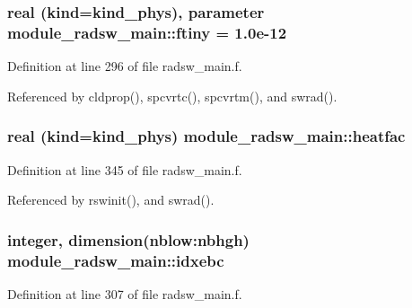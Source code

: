 \subsubsection[{\texorpdfstring{ftiny}{ftiny}}]{\setlength{\rightskip}{0pt plus 5cm}real (kind=kind\+\_\+phys), parameter module\+\_\+radsw\+\_\+main\+::ftiny = 1.\+0e-\/12\hspace{0.3cm}{\ttfamily [private]}}\hypertarget{namespacemodule__radsw__main_abe91ed52b6016e99a2d0c874524fb27f}{}\label{namespacemodule__radsw__main_abe91ed52b6016e99a2d0c874524fb27f}


Definition at line 296 of file radsw\+\_\+main.\+f.



Referenced by cldprop(), spcvrtc(), spcvrtm(), and swrad().

\subsubsection[{\texorpdfstring{heatfac}{heatfac}}]{\setlength{\rightskip}{0pt plus 5cm}real (kind=kind\+\_\+phys) module\+\_\+radsw\+\_\+main\+::heatfac\hspace{0.3cm}{\ttfamily [private]}}\hypertarget{namespacemodule__radsw__main_aad60e753cdda20d4e84d063280f0dfcc}{}\label{namespacemodule__radsw__main_aad60e753cdda20d4e84d063280f0dfcc}


Definition at line 345 of file radsw\+\_\+main.\+f.



Referenced by rswinit(), and swrad().

\subsubsection[{\texorpdfstring{idxebc}{idxebc}}]{\setlength{\rightskip}{0pt plus 5cm}integer, dimension(nblow\+:nbhgh) module\+\_\+radsw\+\_\+main\+::idxebc\hspace{0.3cm}{\ttfamily [private]}}\hypertarget{namespacemodule__radsw__main_aa20102786f7e7f8c71fb2783082eac1b}{}\label{namespacemodule__radsw__main_aa20102786f7e7f8c71fb2783082eac1b}


Definition at line 307 of file radsw\+\_\+main.\+f.



